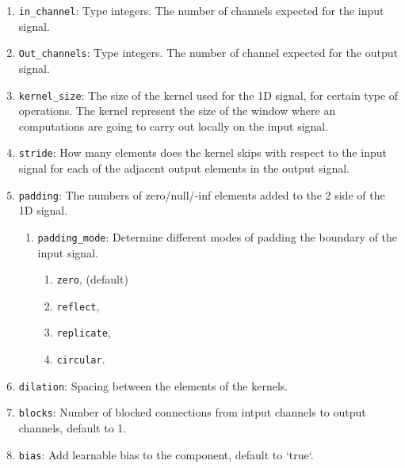 \documentclass[]{article}
\theoremstyle{definition}
\numberwithin{equation}{subsection}
\newcommand{\inlinecode}[1]{\texttt{\footnotesize #1}}
\begin{document}
        \begin{enumerate}
            \item \inlinecode{in\_channel}: Type integers. The number of channels expected for the input signal. 
            
            \item \inlinecode{Out\_channels}: Type integers. The number of channel expected for the output signal. 
            
            \item \inlinecode{kernel\_size}: The size of the kernel used for the 1D signal, for certain type of operations. The kernel represent the size of the window where an computations are going to carry out locally on the input signal. 
            
            \item \inlinecode{stride}: How many elements does the kernel skips with respect to the input signal for each of the adjacent output elements in the output signal. 
            
            \item \inlinecode{padding}: The numbers of zero/null/-inf elements added to the 2 side of the 1D signal. 
                \begin{enumerate}
                    \item \inlinecode{padding\_mode}: Determine different modes of padding the boundary of the input signal. 
                    \begin{enumerate}
                        \item  \inlinecode{zero}, (default)
                        \item  \inlinecode{reflect}, 
                        \item  \inlinecode{replicate}, 
                        \item  \inlinecode{circular}. 
                    \end{enumerate}
                \end{enumerate}   
                  
            \item \inlinecode{dilation}: Spacing between the elements of the kernels. 
            
            \item \inlinecode{blocks}: Number of blocked connections from intput channels to output channels, default to 1. 
            
            \item \inlinecode{bias}: Add learnable bias to the component, default to `true`. 
        \end{enumerate}
\end{document}
